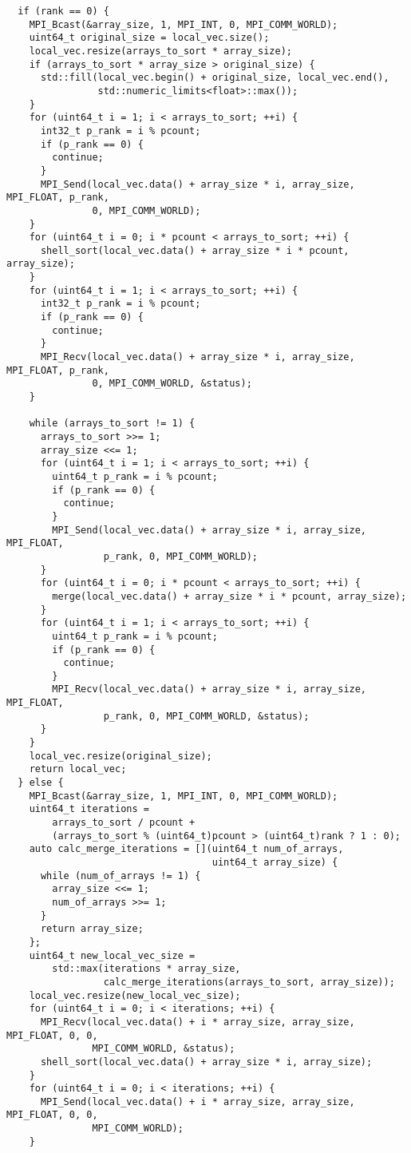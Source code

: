 \documentclass[14pt, a4paper]{extarticle}
\begin{document}
\begin{lstlisting}
  if (rank == 0) {
    MPI_Bcast(&array_size, 1, MPI_INT, 0, MPI_COMM_WORLD);
    uint64_t original_size = local_vec.size();
    local_vec.resize(arrays_to_sort * array_size);
    if (arrays_to_sort * array_size > original_size) {
      std::fill(local_vec.begin() + original_size, local_vec.end(),
                std::numeric_limits<float>::max());
    }
    for (uint64_t i = 1; i < arrays_to_sort; ++i) {
      int32_t p_rank = i % pcount;
      if (p_rank == 0) {
        continue;
      }
      MPI_Send(local_vec.data() + array_size * i, array_size, MPI_FLOAT, p_rank,
               0, MPI_COMM_WORLD);
    }
    for (uint64_t i = 0; i * pcount < arrays_to_sort; ++i) {
      shell_sort(local_vec.data() + array_size * i * pcount, array_size);
    }
    for (uint64_t i = 1; i < arrays_to_sort; ++i) {
      int32_t p_rank = i % pcount;
      if (p_rank == 0) {
        continue;
      }
      MPI_Recv(local_vec.data() + array_size * i, array_size, MPI_FLOAT, p_rank,
               0, MPI_COMM_WORLD, &status);
    }

    while (arrays_to_sort != 1) {
      arrays_to_sort >>= 1;
      array_size <<= 1;
      for (uint64_t i = 1; i < arrays_to_sort; ++i) {
        uint64_t p_rank = i % pcount;
        if (p_rank == 0) {
          continue;
        }
        MPI_Send(local_vec.data() + array_size * i, array_size, MPI_FLOAT,
                 p_rank, 0, MPI_COMM_WORLD);
      }
      for (uint64_t i = 0; i * pcount < arrays_to_sort; ++i) {
        merge(local_vec.data() + array_size * i * pcount, array_size);
      }
      for (uint64_t i = 1; i < arrays_to_sort; ++i) {
        uint64_t p_rank = i % pcount;
        if (p_rank == 0) {
          continue;
        }
        MPI_Recv(local_vec.data() + array_size * i, array_size, MPI_FLOAT,
                 p_rank, 0, MPI_COMM_WORLD, &status);
      }
    }
    local_vec.resize(original_size);
    return local_vec;
  } else {
    MPI_Bcast(&array_size, 1, MPI_INT, 0, MPI_COMM_WORLD);
    uint64_t iterations =
        arrays_to_sort / pcount +
        (arrays_to_sort % (uint64_t)pcount > (uint64_t)rank ? 1 : 0);
    auto calc_merge_iterations = [](uint64_t num_of_arrays,
                                    uint64_t array_size) {
      while (num_of_arrays != 1) {
        array_size <<= 1;
        num_of_arrays >>= 1;
      }
      return array_size;
    };
    uint64_t new_local_vec_size =
        std::max(iterations * array_size,
                 calc_merge_iterations(arrays_to_sort, array_size));
    local_vec.resize(new_local_vec_size);
    for (uint64_t i = 0; i < iterations; ++i) {
      MPI_Recv(local_vec.data() + i * array_size, array_size, MPI_FLOAT, 0, 0,
               MPI_COMM_WORLD, &status);
      shell_sort(local_vec.data() + array_size * i, array_size);
    }
    for (uint64_t i = 0; i < iterations; ++i) {
      MPI_Send(local_vec.data() + i * array_size, array_size, MPI_FLOAT, 0, 0,
               MPI_COMM_WORLD);
    }


\end{lstlisting}
\end{document}

